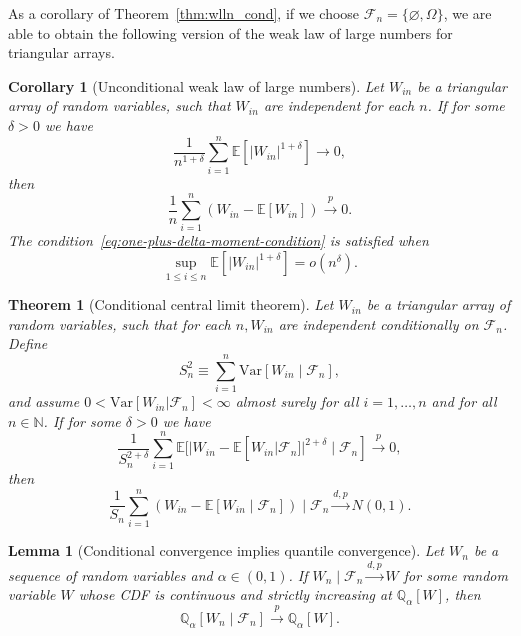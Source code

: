 \documentclass[aos]{imsart}
\theoremstyle{plain}
\newtheorem{theorem}{Theorem}
\newtheorem{lemma}{Lemma}
\newtheorem{corollary}{Corollary}
\theoremstyle{remark}
\newcommand{\E}{\mathbb E}								%
\newcommand{\V}{\mathrm{Var}}							%
\newcommand{\Q}{\mathbb{Q}}								%
\newcommand{\convp}{\overset p \rightarrow}             %
\newcommand{\convdp}{\overset {d,p} \longrightarrow}    %
\begin{document}
As a corollary of Theorem~\ref{thm:wlln_cond}, if we choose $\mathcal{F}_n=\{\varnothing,\Omega\}$, we are able to obtain the following version of the weak law of large numbers for triangular arrays.

\begin{corollary}[Unconditional weak law of large numbers] \label{cor:wlln} 
	Let $W_{in}$ be a triangular array of random variables, such that $W_{in}$ are independent for each $n$. If for some $\delta > 0$ we have
	\begin{equation}
		\frac{1}{n^{1+\delta}}\sum_{i=1}^n\E[|W_{in}|^{1+\delta}] \rightarrow 0,
		\label{eq:one-plus-delta-moment-condition}
	\end{equation}
	then 
	\begin{equation}
		\frac{1}{n} \sum_{i = 1}^n (W_{in} - \E[W_{in}]) \convp 0.
	\end{equation}
	The condition~\eqref{eq:one-plus-delta-moment-condition} is satisfied when
	\begin{equation}
		\sup_{1\leq i\leq n}\E[|W_{in}|^{1+\delta}]=o(n^{\delta}).
		\label{eq:wlln_sufficient}
	\end{equation}
\end{corollary}


\begin{theorem}[Conditional central limit theorem] \label{thm:conditional-clt} 
	Let $W_{in}$ be a triangular array of random variables, such that for each $n,W_{in}$ are independent conditionally on $\mathcal F_n$. Define
	\begin{equation}
		S_n^2 \equiv \sum_{i = 1}^n \V[W_{in} \mid \mathcal F_n],
	\end{equation} 
	and assume $0 < \mathrm{Var}[W_{in}|\mathcal{F}_n]<\infty $ almost surely for all $i=1,\ldots,n$ and for all $n\in\mathbb{N}$. If for some $\delta > 0$ we have
	\begin{equation}
		\frac{1}{S_n^{2+\delta}} \sum_{i = 1}^n \E[|W_{in}-\E[W_{in}|\mathcal{F}_n]|^{2+\delta} \mid \mathcal{F}_n] \convp 0,
		\label{eq:conditional-lyapunov}
	\end{equation}
	then 
	\begin{equation}
		\frac{1}{S_n} \sum_{i = 1}^n (W_{in} - \E[W_{in} \mid \mathcal{F}_n]) \mid \mathcal F_n \convdp N(0,1).
	\end{equation}
	
\end{theorem}

\begin{lemma}[Conditional convergence implies quantile convergence] \label{lem:conditional-convergence-to-quantile} 
	Let $W_n$ be a sequence of random variables and $\alpha \in (0,1)$. If $W_n \mid \mathcal F_n \convdp W$ for some random variable $W$ whose CDF is continuous and strictly increasing at $\mathbb Q_{\alpha}[W]$, then
	\begin{equation}
		\Q_{\alpha}[W_n \mid \mathcal F_n] \convp \Q_{\alpha}[W].
	\end{equation}
\end{lemma}
\end{document}
